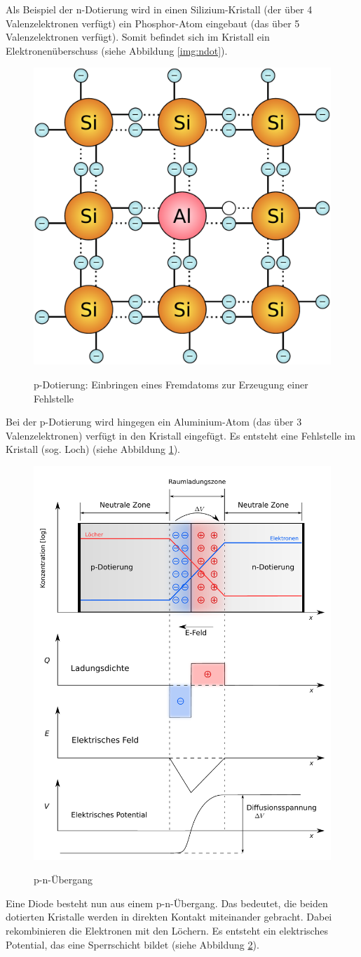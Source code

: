 \documentclass[a4paper,german,12pt,smallheadings]{scrartcl}
\begin{document}
Als Beispiel der n-Dotierung wird in einen Silizium-Kristall (der über 4
Valenzelektronen verfügt) ein Phosphor-Atom eingebaut (das über 5
Valenzelektronen verfügt). Somit befindet sich im Kristall ein
Elektronenüberschuss (siehe Abbildung \ref{img:ndot}).

\begin{figure}[H]
  \centering
  \includegraphics[width=.3\textwidth]{pdot.pdf}
  \label{img:pdot}
  \caption{p-Dotierung: Einbringen eines Fremdatoms zur Erzeugung einer Fehlstelle}
\end{figure}

Bei der p-Dotierung wird hingegen ein Aluminium-Atom (das über 3
Valenzelektronen) verfügt in den Kristall eingefügt. Es entsteht eine
Fehlstelle im Kristall (sog. Loch) (siehe Abbildung \ref{img:pdot}).

\begin{figure}[H]
  \centering
  \includegraphics[width=.6\textwidth]{pnjunct.pdf}
  \label{img:pnjunct}
  \caption{p-n-Übergang}
\end{figure}

Eine Diode besteht nun aus einem p-n-Übergang. Das bedeutet, die beiden
dotierten Kristalle werden in direkten Kontakt miteinander gebracht. Dabei
rekombinieren die Elektronen mit den Löchern. Es entsteht ein elektrisches
Potential, das eine Sperrschicht bildet (siehe Abbildung
\ref{img:pnjunct}).
\end{document}
